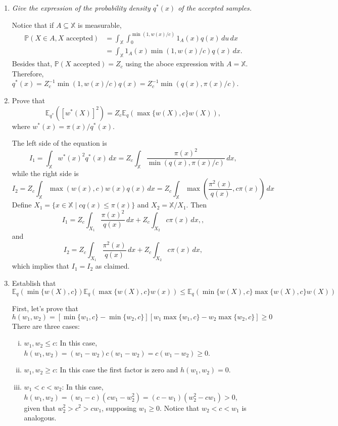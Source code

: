 \documentclass[a4paper,12pt]{article}
\newcommand{\ev}{\mathbb{E}}
\newcommand{\pr}{\mathbb{P}}
\theoremstyle{definition}
\begin{document}
\begin{enumerate}
    \item {\it Give the expression of the probability density 
    $q^*(x)$ of the accepted samples.}

    Notice that if $A \subseteq \mathbb{X}$ is measurable, 
    \begin{equation*}
        \begin{split}
            \pr(X \in A, X \text{ accepted}) &= \int_{\mathbb{X}} \int_0^{\min(1, w(x)/c)} 1_A(x) q(x) \, du \, dx \\
            &= \int_{\mathbb{X}} 1_A(x) \min(1, w(x)/c) q(x) \, dx. 
        \end{split}
    \end{equation*}
    Besides that, $\pr(X \text{ accepted}) = Z_c$ using the aboce expression
    with $A = \mathbb{X}$. Therefore, $q^*(x) = Z_c^{-1}\min(1, w(x)/c) q(x) =
    Z_c^{-1} \min(q(x), \pi(x)/ c)$. 

    \item Prove that 
    $$
    \ev_{q^*}\left([w^*(X)]^2\right) = Z_c\ev_q(\max\{{w(X), c}\}w(X)),
    $$
    where $w^*(x) = \pi(x) / q^*(x)$. 

    The left side of the equation is 
    $$
    I_1 = \int_{\mathbb{X}} w^*(x)^2 q^*(x) \, dx = Z_c\int_{\mathbb{X}} \frac{\pi(x)^2}{\min(q(x), \pi(x)/ c)} \, dx,
    $$
    while the right side is 
    $$
    I_2 = Z_c\int_{\mathbb{X}} \max(w(x), c)w(x)q(x) \, dx = Z_c\int_{\mathbb{X}} \max\left(\frac{\pi^2(x)}{q(x)}, c\pi(x)\right)\, dx 
    $$
    Define $X_1 = \{x \in \mathbb{X} \mid cq(x) \le \pi(x)\}$ and $X_2 =
    \mathbb{X} / X_1$. Then
    $$
    I_1 = Z_c\int_{X_1} \frac{\pi(x)^2}{q(x)} \, dx + Z_c\int_{X_2} c\pi(x) \, dx,,
    $$
    and 
    $$
    I_2 = Z_c\int_{X_1} \frac{\pi^2(x)}{q(x)} \, dx + Z_c\int_{X_2} c\pi(x)\, dx, 
    $$
    which implies that $I_1 = I_2$ as claimed. 

    \item Establish that
    $$
    \ev_q(\min\{{w(X), c}\})\ev_q(\max\{{w (X), c}\} 
    w(x)) \le \ev_q(\min\{{w (X) , c}\}\max\{{w(X), c}\}w (X))
    $$

    First, let's prove that 
    $$h(w_1, w_2) = [\min\{w_1, c\} - \min\{w_2, c\}] [w_1 \max \{w_1, c\} -
    w_2 \max\{w_2, c\}] \ge 0$$      
    There are three cases: 
    \begin{enumerate}[(i)]
        \item $w_1, w_2 \le c$: In this case, $h(w_1, w_2) = (w_1 - w_2)c(w_1 -
        w_2) = c(w_1 - w_2) \ge 0$. 
        \item $w_1, w_2 \ge c$: In this case the first factor is zero and
        $h(w_1, w_2) = 0$. 
        \item $w_1 < c < w_2$: In this case, $h(w_1, w_2) = (w_1 - c)(cw_1 -
        w_2^2) = (c - w_1)(w_2^2 - cw_1) > 0$, given that $w_2^2 > c^2 >
        cw_1$, supposing $w_1 \ge 0$. Notice that $w_2 < c < w_1$ is
        analogous.   
    \end{enumerate}


\end{enumerate}
\end{document}
